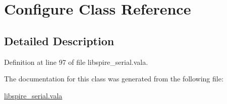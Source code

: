 \hypertarget{classedwinspire_1_1_ports_1_1_configure}{\section{Configure Class Reference}
\label{classedwinspire_1_1_ports_1_1_configure}
}


\subsection{Detailed Description}


Definition at line 97 of file libspire\-\_\-serial.\-vala.



The documentation for this class was generated from the following file\-:\begin{DoxyCompactItemize}
\item 
\hyperlink{libspire__serial_8vala}{libspire\-\_\-serial.\-vala}\end{DoxyCompactItemize}
